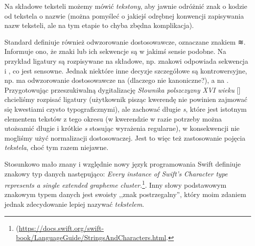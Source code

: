 Na składowe teksteli możemy mówić \textit{tekstony}, aby jawnie
odróżnić znak o kodzie  od tekstela o nazwie
 (można pomyśleć o jakiejś
odrębnej konwencji zapisywania nazw teksteli, ale na tym etapie to
chyba zbędna komplikacja).

Standard definiuje również odwzorowanie dostosowawcze, oznaczane
znakiem {≋}. Informuje ono, że
znaki lub ich sekwencje są w jakimś sensie podobne. Na przykład
ligatury są rozpisywane na składowe, np. znakowi  odpowiada sekwencja  i
, co jest sensowne. Jednak niektóre inne
decyzje szczegółowe są kontrowersyjne, np.  ma
odwzorowanie dostosowawcze na  (dlaczego
nie kanoniczne?), a  na .  Przygotowując przeszukiwalną dygitalizację
\textit{Słownika polszczyzny XVI wieku}
[\cite{bien_dygitalizacja_2010}] chcieliśmy rozpisać ligatury
(użytkownik pisząc kwerendę nie powinien zajmować się kwestiami czysto
typograficznymi), ale zachować długie \textit{s}, które jest istotnym
elementem tekstów z tego okresu (w kwerendzie w razie potrzeby można
utożsamić długie i krótkie \textit{s} stosując wyrażenia regularne), w
konsekwencji nie mogliśmy użyć normalizacji dostosowaczej. Jest to
więc też zastosowanie pojęcia \textit{tekstela}, choć tym razem
niejawne.

Stosunkowo mało znany i względnie nowy język programowania Swift
definiuje znakowy typ danych następująco: \textit{Every instance of
  Swift’s Character type represents a single extended grapheme
  cluster.}\footnote{(\url{https://docs.swift.org/swift-book/LanguageGuide/StringsAndCharacters.html}.}.
Inny słowy podstawowym znakowym typem danych jest swoisty ,,znak
postrzegalny'', który moim zdaniem jednak zdecydowanie lepiej nazywać
\textit{tekstelem}.





% 


